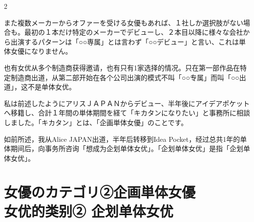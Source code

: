 \documentclass[12pt,UTF8]{ctexbook}
\begin{document}
\begin{paracol}{2}
\switchcolumn*

また複数メーカーからオファーを受ける女優もあれば、１社しか選択肢がない場合も。最初の１本だけ特定のメーカーでデビューし、２本目以降に様々な会社から出演するパターンは「○○専属」とは言わず「○○デビュー」と言い、これは単体女優になりません。

\switchcolumn

也有女优从多个制造商获得邀请，也有只有1家选择的情况。只在第一部作品在特定制造商出道，从第二部开始在各个公司出演的模式不叫「○○专属」而叫「○○出道」，这不是单体女优。

\switchcolumn*

私は前述したようにアリスＪＡＰＡＮからデビュー、半年後にアイデアポケットへ移籍し、合計１年間の単体期間を経て「キカタンになりたい」と事務所に相談しました。「キカタン」とは、「企画単体女優」のことです。

\switchcolumn

如前所述，我从Alice JAPAN出道，半年后转移到Idea Pocket，经过总共1年的单体期间后，向事务所咨询「想成为企划单体女优」。「企划单体女优」是指「企划单体女优」。

\end{paracol}

\section{女優のカテゴリ②企画単体女優\\女优的类别② 企划单体女优}
\end{document}

